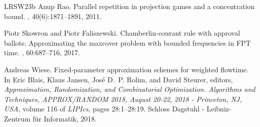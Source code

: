 \documentclass[10pt,a4paper]{article}
\begin{document}
\begin{thebibliography}{LRSW23b}
Anup Rao.
\newblock Parallel repetition in projection games and a concentration bound.
, 40(6):1871--1891, 2011.

Piotr Skowron and Piotr Faliszewski.
\newblock Chamberlin-courant rule with approval ballots: Approximating the
  maxcover problem with bounded frequencies in {FPT} time.
, 60:687--716, 2017.

Andreas Wiese.
\newblock Fixed-parameter approximation schemes for weighted flowtime.
\newblock In Eric Blais, Klaus Jansen, Jos{\'{e}} D.~P. Rolim, and David
  Steurer, editors, {\em Approximation, Randomization, and Combinatorial
  Optimization. Algorithms and Techniques, {APPROX/RANDOM} 2018, August 20-22,
  2018 - Princeton, NJ, {USA}}, volume 116 of {\em LIPIcs}, pages 28:1--28:19.
  Schloss Dagstuhl - Leibniz-Zentrum f{\"{u}}r Informatik, 2018.

\end{thebibliography}
\end{document}
